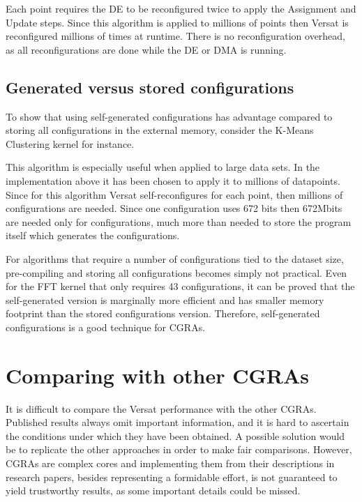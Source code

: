 Each point requires the DE to be reconfigured twice to apply the
Assignment and Update steps. Since this algorithm is applied to
millions of points then Versat is reconfigured millions of times at
runtime. There is no reconfiguration overhead, as all reconfigurations
are done while the DE or DMA is running.

\subsection{Generated versus stored configurations}

To show that using self-generated configurations has advantage
compared to storing all configurations in the external memory,
consider the K-Means Clustering kernel for instance.

This algorithm is especially useful when applied to large data
sets. In the implementation above it has been chosen to apply it to
millions of datapoints. Since for this algorithm Versat
self-reconfigures for each point, then millions of configurations are
needed. Since one configuration uses 672 bits then 672Mbits are needed
only for configurations, much more than needed to store the program
itself which generates the configurations.

For algorithms that require a number of configurations tied to the
dataset size, pre-compiling and storing all configurations becomes
simply not practical. Even for the FFT kernel that only requires 43
configurations, it can be proved that the self-generated version is
marginally more efficient and has smaller memory footprint than the
stored configurations version. Therefore, self-generated
configurations is a good technique for CGRAs.


\section{Comparing with other CGRAs}
\label{subsection:OtherCGRAs}

It is difficult to compare the Versat performance with the other
CGRAs. Published results always omit important information, and it is
hard to ascertain the conditions under which they have been
obtained. A possible solution would be to replicate the other
approaches in order to make fair comparisons. However, CGRAs are
complex cores and implementing them from their descriptions in
research papers, besides representing a formidable effort, is not
guaranteed to yield trustworthy results, as some important details
could be missed.


